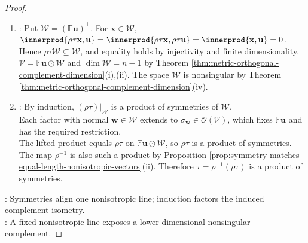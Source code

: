 \begin{theorem}
\begin{proof}
\begin{enumerate}[label=(\roman*)]
Put $\rho=\sigma$ if $\varepsilon=1$, and $\rho=\sigma_{\mathbf{u}}\sigma$ if $\varepsilon=-1$. Then $\rho\tau\mathbf{u}=\mathbf{u}$ by Proposition \ref{prop:symmetry-matches-equal-length-nonisotropic-vectors}(i).
\item {}: Put $\mathcal{W}=(\mathbb{F}\mathbf{u})^{\perp}$. For $\mathbf{x}\in\mathcal{W}$, $\innerprod{\rho\tau\mathbf{x},\mathbf{u}}=\innerprod{\rho\tau\mathbf{x},\rho\tau\mathbf{u}}=\innerprod{\mathbf{x},\mathbf{u}}=0$.\\
Hence $\rho\tau\mathcal{W}\subseteq\mathcal{W}$, and equality holds by injectivity and finite dimensionality.\\
$\mathcal{V}=\mathbb{F}\mathbf{u}\odot\mathcal{W}$ and $\dim\mathcal{W}=n-1$ by Theorem \ref{thm:metric-orthogonal-complement-dimension}(i),(ii). The space $\mathcal{W}$ is nonsingular by Theorem \ref{thm:metric-orthogonal-complement-dimension}(iv).
\item {}: By induction, $(\rho\tau)|_{\mathcal{W}}$ is a product of symmetries of $\mathcal{W}$.\\
Each factor with normal $\mathbf{w}\in\mathcal{W}$ extends to $\sigma_{\mathbf{w}}\in\mathcal{O}(\mathcal{V})$, which fixes $\mathbb{F}\mathbf{u}$ and has the required restriction.\\
The lifted product equals $\rho\tau$ on $\mathbb{F}\mathbf{u}\odot\mathcal{W}$, so $\rho\tau$ is a product of symmetries.\\
The map $\rho^{-1}$ is also such a product by Proposition \ref{prop:symmetry-matches-equal-length-nonisotropic-vectors}(ii). Therefore $\tau=\rho^{-1}(\rho\tau)$ is a product of symmetries.
\end{enumerate}
: Symmetries align one nonisotropic line; induction factors the induced complement isometry.\\
: A fixed nonisotropic line exposes a lower-dimensional nonsingular complement.
\end{proof}
\end{theorem}

